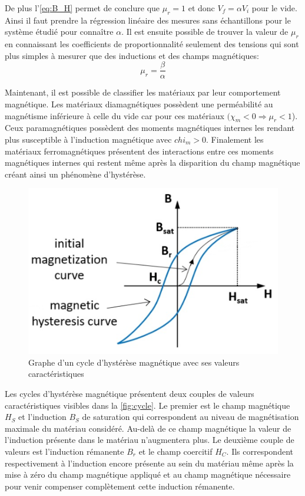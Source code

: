 De plus l'\autoref{eq:B_H} permet de conclure que \(\mu_r = 1\) et donc \(V_f = \alpha V_i\) pour le vide. Ainsi il faut prendre la régression linéaire des mesures sans échantillons pour le système étudié pour connaître \(\alpha\). Il est ensuite possible de trouver la valeur de \(\mu_r\) en connaissant les coefficients de proportionnalité seulement des tensions qui sont plus simples à mesurer que des inductions et des champs magnétiques:
\begin{equation} 
    \mu_r = \frac{\beta}{\alpha}
    \label{eq:mu_r}
\end{equation} 


Maintenant, il est possible de classifier les matériaux par leur comportement magnétique. Les matériaux diamagnétiques possèdent une perméabilité au magnétisme inférieure à celle du vide car pour ces matériaux \((\chi_m < 0 \Rightarrow \mu_r < 1\)). Ceux paramagnétiques possèdent des moments magnétiques internes les rendant plus susceptible à l'induction magnétique avec \(chi_m > 0\). Finalement les matériaux ferromagnétiques présentent des interactions entre ces moments magnétiques internes qui restent même après la disparition du champ magnétique créant ainsi un phénomène d'hystérèse.

\begin{figure}
    \centering
    \includegraphics[width=0.7\linewidth]{figures/cycle_hysterese.png}
    \caption{Graphe d'un cycle d'hystérèse magnétique avec ses valeurs caractéristiques \cite{graph_cycle}}
    \label{fig:cycle}
\end{figure}
Les cycles d'hystérèse magnétique présentent deux couples de valeurs caractéristiques visibles dans la \autoref{fig:cycle}. Le premier est le champ magnétique \(H_S\) et l'induction \(B_S\) de saturation qui correspondent au niveau de magnétisation maximale du matériau considéré. Au-delà de ce champ magnétique la valeur de l'induction présente dans le matériau n'augmentera plus. Le deuxième couple de valeurs est l'induction rémanente \(B_r\) et le champ coercitif \(H_C\). Ils correspondent respectivement à l'induction encore présente au sein du matériau même après la mise à zéro du champ magnétique appliqué et au champ magnétique nécessaire pour venir compenser complètement cette induction rémanente.